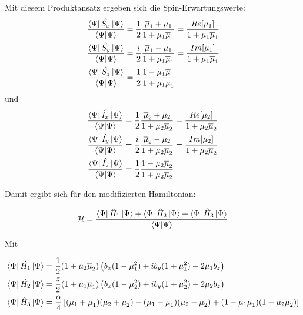 Mit diesem Produktansatz ergeben sich die Spin-Erwartungswerte:
\begin{align}
    \frac{\bra{\Psi}\hat{S_x}\ket{\Psi}}{\bra{\Psi}\ket{\Psi}} &= \frac{1}{2}\frac{\overline{\mu}_1 + \mu_1}{1+\mu_1\overline{\mu}_1} = \frac{Re[\mu_1]}{1 + \mu_1\overline{\mu}_1} \\
    \frac{\bra{\Psi}\hat{S_y}\ket{\Psi}}{\bra{\Psi}\ket{\Psi}} &= \frac{i}{2}\frac{\overline{\mu}_1 - \mu_1}{1+\mu_1\overline{\mu}_1} = \frac{Im[\mu_1]}{1 + \mu_1\overline{\mu}_1} \\
    \frac{\bra{\Psi}\hat{S_z}\ket{\Psi}}{\bra{\Psi}\ket{\Psi}} &= \frac{1}{2}\frac{1 - \mu_1\overline{\mu}_1}{1 + \mu_1\overline{\mu}_1}  
\end{align}
und 
\begin{align}
    \frac{\bra{\Psi}\hat{I_x}\ket{\Psi}}{\bra{\Psi}\ket{\Psi}} &= \frac{1}{2}\frac{\overline{\mu}_2 + \mu_2}{1+\mu_2\overline{\mu}_2} = \frac{Re[\mu_2]}{1 + \mu_2\overline{\mu}_2} \\
    \frac{\bra{\Psi}\hat{I_y}\ket{\Psi}}{\bra{\Psi}\ket{\Psi}} &= \frac{i}{2}\frac{\overline{\mu}_2 - \mu_2}{1+\mu_2\overline{\mu}_2} = \frac{Im[\mu_2]}{1 + \mu_2\overline{\mu}_2} \\
    \frac{\bra{\Psi}\hat{I_z}\ket{\Psi}}{\bra{\Psi}\ket{\Psi}} &= \frac{1}{2}\frac{1 - \mu_2\overline{\mu}_2}{1 + \mu_2\overline{\mu}_2}
\end{align}



Damit ergibt sich für den modifizierten Hamiltonian: 

\begin{align}
    \mathcal{H} &= \frac{\bra{\Psi}\hat{H}_1\ket{\Psi}+ \bra{\Psi}\hat{H}_2\ket{\Psi} +\bra{\Psi}\hat{H}_3\ket{\Psi}}{\bra{\Psi}\ket{\Psi}}\\
\end{align}

Mit

\begin{align}
   \bra{\Psi}\hat{H_1}\ket{\Psi} &= \frac{1}{2}(1+\mu_2\overline{\mu}_2)\left(b_x(1-\mu_1^2) + ib_y(1+\mu_1^2) - 2\mu_1 b_z\right)\\
   \bra{\Psi}\hat{H_2}\ket{\Psi} &= \frac{z}{2}(1+\mu_1\overline{\mu}_1)\left(b_x(1-\mu_2^2) + ib_y(1+\mu_2^2) - 2\mu_2 b_z\right)\\
   \bra{\Psi}\hat{H}_3\ket{\Psi} &= \frac{\alpha}{4}\left[( \mu_1 + \overline{\mu}_1)( \mu_2 + \overline{\mu}_2) - (\mu_1-\overline{\mu}_1)(\mu_2 - \overline{\mu}_2) + (1-\mu_1\overline{\mu}_1)(1-\mu_2\overline{\mu}_2)\right]
\end{align}  


